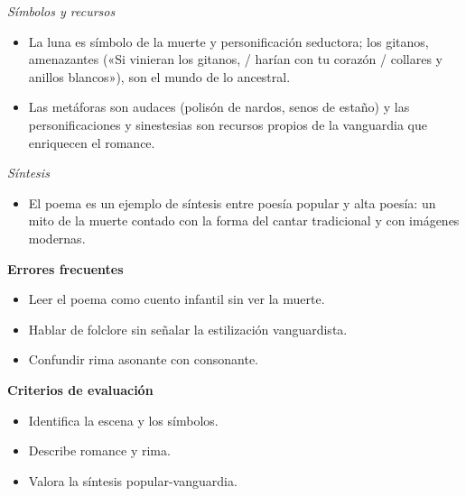 \documentclass{book}
\begin{document}
\begin{tcolorbox}[title={Ejercicio resuelto}, studiumworked, breakable]
\noindent\textit{Símbolos y recursos}
\begin{itemize}
\item La luna es símbolo de la muerte y personificación seductora; los gitanos, amenazantes («Si vinieran los gitanos, / harían con tu corazón / collares y anillos blancos»), son el mundo de lo ancestral.
\item Las metáforas son audaces (polisón de nardos, senos de estaño) y las personificaciones y sinestesias son recursos propios de la vanguardia que enriquecen el romance.
\end{itemize}

\noindent\textit{Síntesis}
\begin{itemize}
\item El poema es un ejemplo de síntesis entre poesía popular y alta poesía: un mito de la muerte contado con la forma del cantar tradicional y con imágenes modernas.
\end{itemize}

\noindent\textbf{Errores frecuentes}
\begin{itemize}
\item Leer el poema como cuento infantil sin ver la muerte.
\item Hablar de folclore sin señalar la estilización vanguardista.
\item Confundir rima asonante con consonante.
\end{itemize}

\noindent\textbf{Criterios de evaluación}
\begin{itemize}
\item Identifica la escena y los símbolos.
\item Describe romance y rima.
\item Valora la síntesis popular-vanguardia.
\end{itemize}
\end{tcolorbox}
\end{document}
